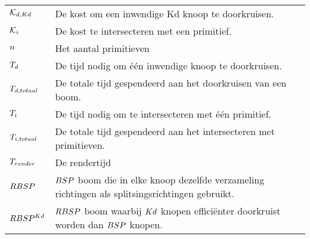 \documentclass[master=cws,masteroption=mmc]{kulemt}
\begin{document}
\begin{flushleft}
\begin{tabularx}{\textwidth}{@{}p{25mm}X@{}}
    $\mathcal{K}_{d,Kd}$ & De kost om een inwendige Kd knoop te doorkruisen. \\
    $\mathcal{K}_{i}$ & De kost te intersecteren met een primitief. \\
    $n$ & Het aantal primitieven\\
    $T_{d}$ & De tijd nodig om één inwendige knoop te doorkruisen. \\
    $T_{d, totaal}$ & De totale tijd gespendeerd aan het doorkruisen van een boom. \\
    $T_{i}$ & De tijd nodig om te intersecteren met één primitief. \\
    $T_{i, totaal}$ & De totale tijd gespendeerd aan het intersecteren met primitieven. \\
    $T_{render}$ & De rendertijd\\
    $RBSP$ & $BSP$ boom die in elke knoop dezelfde verzameling richtingen als splitsingsrichtingen gebruikt. \\
    $RBSP^{Kd}$ & $RBSP$ boom waarbij $Kd$ knopen efficiënter doorkruist worden dan $BSP$ knopen. \\
  
  \end{tabularx}
\end{flushleft}

\mainmatter







%
%

\backmatter


\end{document}

